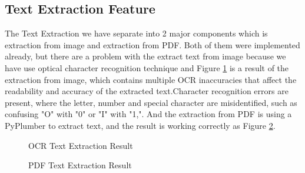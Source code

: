 \documentclass[12pt,oneside,openright,a4paper]{cpe-english-project}
\begin{document}
\subsection{Text Extraction Feature}
The Text Extraction we have separate into 2 major components which is extraction from image and extraction from PDF. Both of them were implemented already, but there are a problem with the extract text from image because we have use optical character recognition technique and Figure \ref{fig:ocr-result} is a result of the extraction from image, which  contains multiple OCR inaccuracies that affect the readability and accuracy of the extracted text.Character recognition errors are present, where the letter, number and special character are misidentified, such as confusing "O" with "0" or "I" with "1,". And the extraction from PDF is using a PyPlumber to extract text, and the result is working correctly as Figure \ref{fig:pdf-result}.

\begin{figure}[H]
\centering
{}
\caption{OCR Text Extraction Result}\label{fig:ocr-result}
\end{figure}

\begin{figure}[H]
\centering
{}
\caption{PDF Text Extraction Result}\label{fig:pdf-result}
\end{figure}
\end{document}
